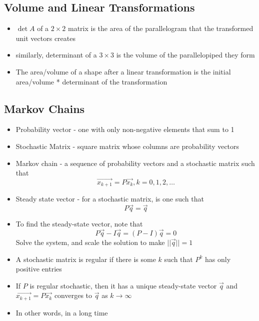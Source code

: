 \documentclass{article}
\begin{document}
\subsection{Volume and Linear Transformations}
\begin{itemize}
    \item \(\det{A}\) of a \(2\times 2\) matrix is the area of the parallelogram that the transformed unit vectors creates 
    \item similarly, determinant of a \(3\times 3\) is the volume of the parallelopiped they form
    \item The area/volume of a shape after a linear transformation is the initial area/volume * determinant of the transformation
\end{itemize}

\subsection{Markov Chains}
\begin{itemize}
    \item Probability vector - one with only non-negative elements that sum to 1
    \item Stochastic Matrix - square matrix whose columns are probability vectors 
    \item Markov chain - a sequence of probability vectors and a stochastic matrix such that 
    \[\vec{x_{k+1}}=P\vec{x_{k}}, k=0,1,2,\dots\]
    \item Steady state vector - for a stochastic matrix, is one such that 
    \[P\vec{q}=\vec{q}\]
    \item To find the steady-state vector, note that 
    \[P\vec{q}-I\vec{q}=(P-I)\vec{q}=0\] Solve the system, and scale the solution to make \(||\vec{q}||=1\)
    \item A stochastic matrix is regular if there is some \(k\) such that \(P^k\) has only positive entries 
    \item If \(P\) is regular stochastic, then it has a unique steady-state vector \(\vec{q}\) and \(\vec{x_{k+1}}=P\vec{x_k}\) converges to \(\vec{q}\) as \(k\rightarrow\infty\)
    \item In other words, in a long time
\end{itemize}
\end{document}
